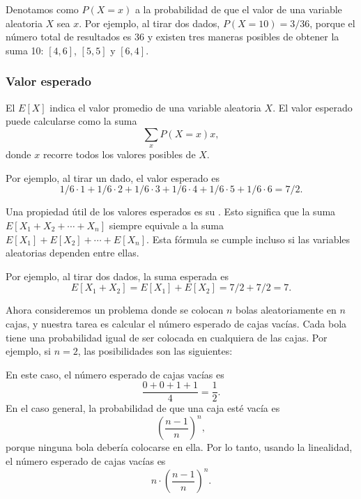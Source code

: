 Denotamos como $P(X=x)$ a la probabilidad de que el valor de una variable
aleatoria $X$ sea $x$. Por ejemplo, al tirar dos dados, $P(X=10)=3/36$,
porque el número total de resultados es 36 y existen tres maneras posibles
de obtener la suma 10: $[4,6]$, $[5,5]$ y $[6,4]$.

\subsubsection{Valor esperado}


El  $E[X]$ indica el valor promedio de una variable
aleatoria $X$. El valor esperado puede calcularse como la suma
\[\sum_x P(X=x)x,\]
donde $x$ recorre todos los valores posibles de $X$.

Por ejemplo, al tirar un dado, el valor esperado es
\[1/6 \cdot 1 + 1/6 \cdot 2 + 1/6 \cdot 3 + 1/6 \cdot 4 + 1/6 \cdot 5 + 1/6 \cdot 6 = 7/2.\]

Una propiedad útil de los valores esperados es su .
Esto significa que la suma $E[X_1+X_2+\cdots+X_n]$ siempre equivale a la suma
$E[X_1]+E[X_2]+\cdots+E[X_n]$. Esta fórmula se cumple incluso si las
variables aleatorias dependen entre ellas.

Por ejemplo, al tirar dos dados, la suma esperada es
\[E[X_1+X_2]=E[X_1]+E[X_2]=7/2+7/2=7.\]

Ahora consideremos un problema donde se colocan $n$ bolas aleatoriamente
en $n$ cajas, y nuestra tarea es calcular el número esperado de cajas
vacías. Cada bola tiene una probabilidad igual de ser colocada en cualquiera
de las cajas. Por ejemplo, si $n=2$, las posibilidades son las siguientes:
\begin{center}
\end{center}
En este caso, el número esperado de cajas vacías es
\[\frac{0+0+1+1}{4} = \frac{1}{2}.\]
En el caso general, la probabilidad de que una caja esté vacía es
\[\left(\frac{n-1}{n}\right)^n,\]
porque ninguna bola debería colocarse en ella. Por lo tanto, usando la
linealidad, el número esperado de cajas vacías es
\[n \cdot \left(\frac{n-1}{n}\right)^n.\]

